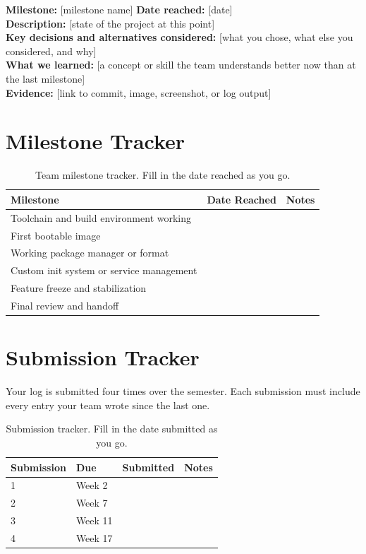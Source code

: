 \documentclass[11pt]{article}
\begin{document}
\begin{fillBox}
\textbf{Milestone:} [milestone name] \quad \textbf{Date reached:} [date] \\
\textbf{Description:} [state of the project at this point] \\
\textbf{Key decisions and alternatives considered:} [what you chose, what else you considered, and why] \\
\textbf{What we learned:} [a concept or skill the team understands better now than at the last milestone] \\
\textbf{Evidence:} [link to commit, image, screenshot, or log output]
\end{fillBox}

\section{Milestone Tracker}

\begin{table}[H]
\centering
\caption{Team milestone tracker. Fill in the date reached as you go.}
\label{tab:milestone-tracker}
\begin{tabular}{@{}p{4.2cm}p{2.4cm}p{5.9cm}@{}}
\toprule
\textbf{Milestone} & \textbf{Date Reached} & \textbf{Notes} \\
\midrule
Toolchain and build environment working & & \\
First bootable image & & \\
Working package manager or format & & \\
Custom init system or service management & & \\
Feature freeze and stabilization & & \\
Final review and handoff & & \\
\bottomrule
\end{tabular}
\end{table}

\section{Submission Tracker}

Your log is submitted four times over the semester. Each submission must include every entry your team wrote since the last one.

\begin{table}[H]
\centering
\caption{Submission tracker. Fill in the date submitted as you go.}
\label{tab:submission-tracker}
\begin{tabular}{@{}p{2.6cm}p{2.2cm}p{2.6cm}p{4.9cm}@{}}
\toprule
\textbf{Submission} & \textbf{Due} & \textbf{Submitted} & \textbf{Notes} \\
\midrule
1 & Week 2 & & \\
2 & Week 7 & & \\
3 & Week 11 & & \\
4 & Week 17 & & \\
\bottomrule
\end{tabular}
\end{table}
\end{document}
